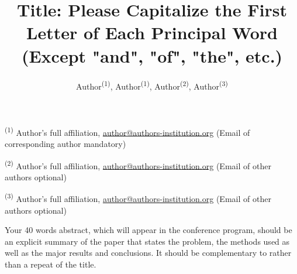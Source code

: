 \documentclass[a4paper, oneside, twocolumn, notitlepage, 10pt]{style/extarticle_ecoc2015}
\begin{document}


\title{Title: Please Capitalize the First Letter of Each Principal Word\\(Except "and", "of", "the", etc.)}


\author{
    Author\textsuperscript{(1)}, Author\textsuperscript{(1)},
    Author\textsuperscript{(2)}, Author\textsuperscript{(3)}
}

\maketitle                  %


\begin{strip}
 \begin{author_descr}

   \textsuperscript{(1)} Author's full affiliation,
   \uline{author@authors-institution.org} (Email of corresponding author mandatory)

   \textsuperscript{(2)} Author's full affiliation,
   \uline{author@authors-institution.org} (Email of other authors optional)

   \textsuperscript{(3)} Author's full affiliation,
   \uline{author@authors-institution.org} (Email of other authors optional)

 \end{author_descr}
\end{strip}



\begin{strip}
  \begin{ecoc_abstract}
    Your 40 words abstract, which will appear in the conference program, should be an explicit summary of the paper that states the problem, the methods used as well as the major results and conclusions. It should be complementary to rather than a repeat of the title.
  \end{ecoc_abstract}
\end{strip}
\end{document}
